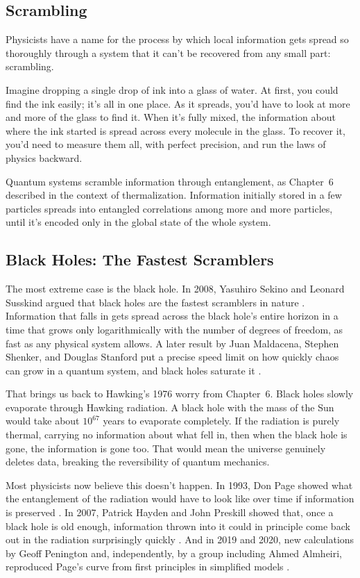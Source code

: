 \subsection{Scrambling}

Physicists have a name for the process by which local information gets spread so thoroughly through a system that it can't be recovered from any small part: scrambling.

Imagine dropping a single drop of ink into a glass of water. At first, you could find the ink easily; it's all in one place. As it spreads, you'd have to look at more and more of the glass to find it. When it's fully mixed, the information about where the ink started is spread across every molecule in the glass. To recover it, you'd need to measure them all, with perfect precision, and run the laws of physics backward.

Quantum systems scramble information through entanglement, as Chapter~6 described in the context of thermalization. Information initially stored in a few particles spreads into entangled correlations among more and more particles, until it's encoded only in the global state of the whole system.

\subsection{Black Holes: The Fastest Scramblers}

The most extreme case is the black hole. In 2008, Yasuhiro Sekino and Leonard Susskind argued that black holes are the fastest scramblers in nature \cite{sekinosusskind2008}. Information that falls in gets spread across the black hole's entire horizon in a time that grows only logarithmically with the number of degrees of freedom, as fast as any physical system allows. A later result by Juan Maldacena, Stephen Shenker, and Douglas Stanford put a precise speed limit on how quickly chaos can grow in a quantum system, and black holes saturate it \cite{maldacena2016}.

That brings us back to Hawking's 1976 worry from Chapter~6. Black holes slowly evaporate through Hawking radiation. A black hole with the mass of the Sun would take about \(10^{67}\) years to evaporate completely. If the radiation is purely thermal, carrying no information about what fell in, then when the black hole is gone, the information is gone too. That would mean the universe genuinely deletes data, breaking the reversibility of quantum mechanics.

Most physicists now believe this doesn't happen. In 1993, Don Page showed what the entanglement of the radiation would have to look like over time if information is preserved \cite{page1993}. In 2007, Patrick Hayden and John Preskill showed that, once a black hole is old enough, information thrown into it could in principle come back out in the radiation surprisingly quickly \cite{haydenpreskill2007}. And in 2019 and 2020, new calculations by Geoff Penington and, independently, by a group including Ahmed Almheiri, reproduced Page's curve from first principles in simplified models \cite{penington2020,almheiri2019}.

